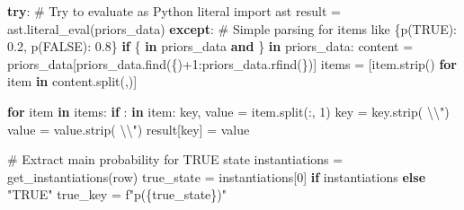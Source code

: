 \documentclass[
  11pt,
  letterpaper,
]{book}
\newenvironment{Shaded}{\begin{snugshade}}{\end{snugshade}}
\newcommand{\CharTok}[1]{\textcolor[rgb]{0.13,0.47,0.30}{#1}}
\newcommand{\CommentTok}[1]{\textcolor[rgb]{0.37,0.37,0.37}{#1}}
\newcommand{\ControlFlowTok}[1]{\textcolor[rgb]{0.00,0.23,0.31}{\textbf{#1}}}
\newcommand{\DecValTok}[1]{\textcolor[rgb]{0.68,0.00,0.00}{#1}}
\newcommand{\ImportTok}[1]{\textcolor[rgb]{0.00,0.46,0.62}{#1}}
\newcommand{\KeywordTok}[1]{\textcolor[rgb]{0.00,0.23,0.31}{\textbf{#1}}}
\newcommand{\NormalTok}[1]{\textcolor[rgb]{0.00,0.23,0.31}{#1}}
\newcommand{\OperatorTok}[1]{\textcolor[rgb]{0.37,0.37,0.37}{#1}}
\newcommand{\SpecialCharTok}[1]{\textcolor[rgb]{0.37,0.37,0.37}{#1}}
\newcommand{\SpecialStringTok}[1]{\textcolor[rgb]{0.13,0.47,0.30}{#1}}
\newcommand{\StringTok}[1]{\textcolor[rgb]{0.13,0.47,0.30}{#1}}
\begin{document}
\begin{Shaded}
\begin{Highlighting}[]
        \ControlFlowTok{try}\NormalTok{:}
            \CommentTok{\# Try to evaluate as Python literal}
            \ImportTok{import}\NormalTok{ ast}
\NormalTok{            result }\OperatorTok{=}\NormalTok{ ast.literal\_eval(priors\_data)}
        \ControlFlowTok{except}\NormalTok{:}
            \CommentTok{\# Simple parsing for items like \{\textquotesingle{}p(TRUE)\textquotesingle{}: \textquotesingle{}0.2\textquotesingle{}, \textquotesingle{}p(FALSE)\textquotesingle{}: \textquotesingle{}0.8\textquotesingle{}\}}
            \ControlFlowTok{if} \StringTok{\textquotesingle{}\{\textquotesingle{}} \KeywordTok{in}\NormalTok{ priors\_data }\KeywordTok{and} \StringTok{\textquotesingle{}\}\textquotesingle{}} \KeywordTok{in}\NormalTok{ priors\_data:}
\NormalTok{                content }\OperatorTok{=}\NormalTok{ priors\_data[priors\_data.find(}\StringTok{\textquotesingle{}\{\textquotesingle{}}\NormalTok{)}\OperatorTok{+}\DecValTok{1}\NormalTok{:priors\_data.rfind(}\StringTok{\textquotesingle{}\}\textquotesingle{}}\NormalTok{)]}
\NormalTok{                items }\OperatorTok{=}\NormalTok{ [item.strip() }\ControlFlowTok{for}\NormalTok{ item }\KeywordTok{in}\NormalTok{ content.split(}\StringTok{\textquotesingle{},\textquotesingle{}}\NormalTok{)]}

                \ControlFlowTok{for}\NormalTok{ item }\KeywordTok{in}\NormalTok{ items:}
                    \ControlFlowTok{if} \StringTok{\textquotesingle{}:\textquotesingle{}} \KeywordTok{in}\NormalTok{ item:}
\NormalTok{                        key, value }\OperatorTok{=}\NormalTok{ item.split(}\StringTok{\textquotesingle{}:\textquotesingle{}}\NormalTok{, }\DecValTok{1}\NormalTok{)}
\NormalTok{                        key }\OperatorTok{=}\NormalTok{ key.strip(}\StringTok{\textquotesingle{} }\CharTok{\textbackslash{}\textquotesingle{}\textbackslash{}"}\StringTok{\textquotesingle{}}\NormalTok{)}
\NormalTok{                        value }\OperatorTok{=}\NormalTok{ value.strip(}\StringTok{\textquotesingle{} }\CharTok{\textbackslash{}\textquotesingle{}\textbackslash{}"}\StringTok{\textquotesingle{}}\NormalTok{)}
\NormalTok{                        result[key] }\OperatorTok{=}\NormalTok{ value}

    \CommentTok{\# Extract main probability for TRUE state}
\NormalTok{    instantiations }\OperatorTok{=}\NormalTok{ get\_instantiations(row)}
\NormalTok{    true\_state }\OperatorTok{=}\NormalTok{ instantiations[}\DecValTok{0}\NormalTok{] }\ControlFlowTok{if}\NormalTok{ instantiations }\ControlFlowTok{else} \StringTok{"TRUE"}
\NormalTok{    true\_key }\OperatorTok{=} \SpecialStringTok{f"p(}\SpecialCharTok{\{}\NormalTok{true\_state}\SpecialCharTok{\}}\SpecialStringTok{)"}


\end{Highlighting}
\end{Shaded}
\end{document}
